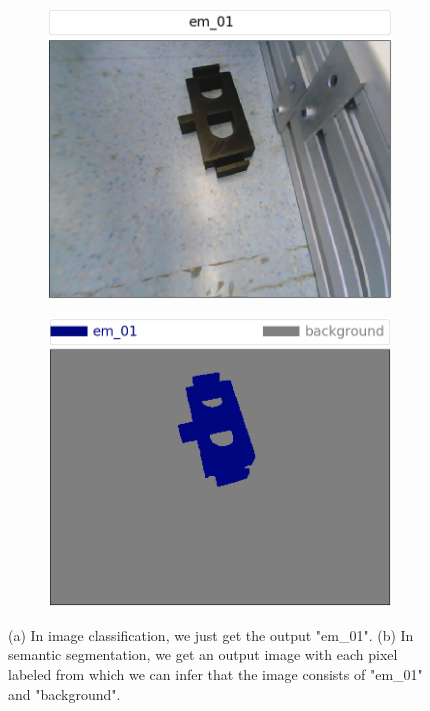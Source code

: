 	\begin{figure}[h]
		\centering
		\begin{subfigure}{.4\textwidth}
			\centering
			\includegraphics[width=1\linewidth]{images/classification}
			\caption{}
			\label{Fig:cls}
		\end{subfigure}
		\begin{subfigure}{.4\textwidth}
			\centering
			\includegraphics[width=1\linewidth]{images/segmentation}
			\caption{}
			\label{Fig:seg}
		\end{subfigure}
		\caption{(a) In image classification, we just get the output "em\_01". (b) In semantic segmentation, we get an output image with each pixel labeled from which we can infer that the image consists of "em\_01" and "background".}
		\label{Fig:clsseg}
	\end{figure}
	
